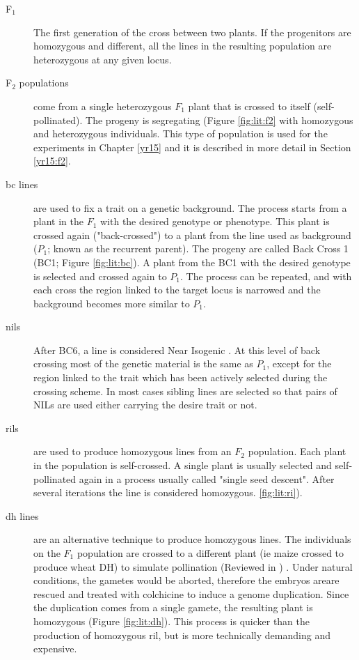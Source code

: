 \begin{description}
\item[F$_{1}$] The first generation of the cross between two plants. If the progenitors are homozygous and different, all the lines in the resulting population are heterozygous at any given locus. 
\item[F$_{2}$ populations] come from a single heterozygous $F_{1}$ plant that is crossed to itself (self-pollinated). The progeny is segregating (Figure \ref{fig:lit:f2} with homozygous and heterozygous individuals. This type of population is used for the experiments in Chapter \ref{yr15} and it is described in more detail in Section \ref{yr15:f2}. 
\item[\gls{bc} lines] are used to fix a trait on a genetic background. The process starts from a plant in the $F_{1}$ with the desired genotype or phenotype. This plant is crossed again ("back-crossed") to a plant from the line used as background ($P_{1}$; known as the recurrent parent). The progeny are called Back Cross 1 (BC1; Figure \ref{fig:lit:bc}). A plant from the BC1 with the desired genotype is selected and crossed again to $P_{1}$. The process can be repeated, and with each cross the region linked to the target locus is narrowed and the background becomes more similar to $P_{1}$. 
\item[\glspl{nil}] After BC6, a line is considered Near Isogenic \citep{Stam1981}. At this level of back crossing most of the genetic material is the same as $P_{1}$, except for the region linked to the trait which has been actively selected during the crossing scheme. In most cases sibling lines are selected so that pairs of NILs are used either carrying the desire trait or not. 
\item[\glspl{ril}] are used to produce homozygous lines from an $F_{2}$ population. Each plant in the population is self-crossed. A single plant is usually selected and self-pollinated again in a process usually called "single seed descent". After several iterations the line is considered homozygous. \ref{fig:lit:ri}).
\item[\gls{dh} lines ] are an alternative technique to produce homozygous lines. The individuals on the $F_{1}$ population are crossed to a different plant (ie maize crossed to produce wheat DH) to simulate pollination  (Reviewed in \citealt{Niu2014}) . Under natural conditions, the gametes would be aborted, therefore the embryos areare rescued and treated with colchicine to induce a genome duplication. Since the duplication comes from a single gamete, the resulting plant is homozygous (Figure \ref{fig:lit:dh}). This process is quicker than the production of homozygous \gls{ril}, but is more technically demanding and expensive. 

 
\end{description}

